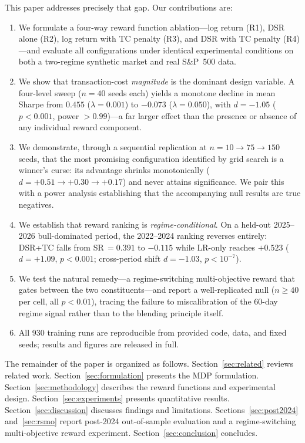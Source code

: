 \documentclass[conference]{IEEEtran}
\begin{document}
This paper addresses precisely that gap. Our contributions are:
\begin{enumerate}
    \item We formulate a four-way reward function ablation---log return (R1), DSR
    alone (R2), log return with TC penalty (R3), and DSR with TC penalty (R4)---and
    evaluate all configurations under identical experimental conditions on both a
    two-regime synthetic market and real S\&P~500 data.
    \item We show that transaction-cost \emph{magnitude} is the dominant design
    variable. A four-level sweep ($n=40$ seeds each) yields a monotone decline in
    mean Sharpe from $0.455$ ($\lambda=0.001$) to $-0.073$ ($\lambda=0.050$),
    with $d=-1.05$ ($p<0.001$, power $>0.99$)---a far larger effect than the
    presence or absence of any individual reward component.
    \item We demonstrate, through a sequential replication at $n=10 \to 75 \to
    150$ seeds, that the most promising configuration identified by grid search
    is a winner's curse: its advantage shrinks monotonically ($d=+0.51 \to +0.30
    \to +0.17$) and never attains significance. We pair this with a power
    analysis establishing that the accompanying null results are true negatives.
    \item We establish that reward ranking is \emph{regime-conditional}. On a
    held-out 2025--2026 bull-dominated period, the 2022--2024 ranking reverses
    entirely: DSR+TC falls from SR$\,=0.391$ to $-0.115$ while LR-only reaches
    $+0.523$ ($d=+1.09$, $p<0.001$; cross-period shift $d=-1.03$, $p<10^{-7}$).
    \item We test the natural remedy---a regime-switching multi-objective reward
    that gates between the two constituents---and report a well-replicated null
    ($n\geq40$ per cell, all $p<0.01$), tracing the failure to miscalibration of
    the 60-day regime signal rather than to the blending principle itself.
    \item All 930 training runs are reproducible from provided code, data, and
    fixed seeds; results and figures are released in full.
\end{enumerate}

The remainder of the paper is organized as follows. Section~\ref{sec:related}
reviews related work. Section~\ref{sec:formulation} presents the MDP formulation.
Section~\ref{sec:methodology} describes the reward functions and experimental
design. Section~\ref{sec:experiments} presents quantitative results. 
Section~\ref{sec:discussion} discusses findings and limitations.
Sections~\ref{sec:post2024} and~\ref{sec:rsmo} report post-2024 out-of-sample
evaluation and a regime-switching multi-objective reward experiment.
Section~\ref{sec:conclusion} concludes.
\end{document}
